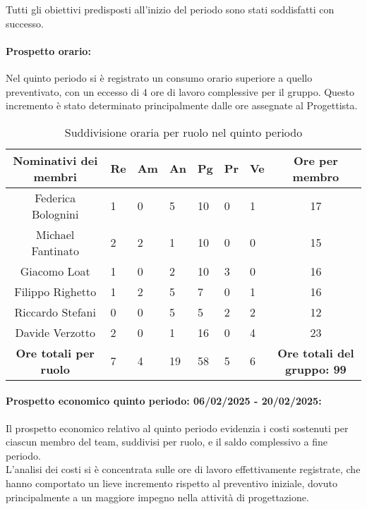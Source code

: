 Tutti gli obiettivi predisposti all'inizio del periodo sono stati soddisfatti con successo.\\

\newpage
\paragraph{Prospetto orario: }
Nel quinto periodo si è registrato un consumo orario superiore a quello preventivato, con un eccesso di 4 ore di lavoro complessive per il gruppo. Questo incremento è stato determinato principalmente dalle ore assegnate al Progettista.
\begin{table}[h!]
    \centering
    \renewcommand{\arraystretch}{1.5}
    \begin{tabularx}{\textwidth}{|c|X|X|X|X|X|X|c|}\hline
    \rowcolor[HTML]{FFD700} 
    \textbf{Nominativi dei membri} & \textbf{Re} & \textbf{Am} & \textbf{An} & \textbf{Pg} & \textbf{Pr} & \textbf{Ve} & \textbf{Ore per membro} \\ \hline
    Federica Bolognini & 1 & 0 & 5 & 10 & 0 & 1 & 17  \\ \hline
    Michael Fantinato  & 2 & 2 & 1 & 10 & 0 & 0 & 15  \\ \hline
    Giacomo Loat       & 1 & 0 & 2 & 10 & 3 & 0 & 16 \\ \hline
    Filippo Righetto   & 1 & 2 & 5 & 7 & 0 & 1 & 16  \\ \hline
    Riccardo Stefani   & 0 & 0 & 5 & 5 & 2 & 2 & 12 \\ \hline
    Davide Verzotto    & 2 & 0 & 1 & 16 & 0 & 4 & 23  \\ \hline
    \rowcolor[HTML]{FFD700} 
    \textbf{Ore totali per ruolo} & 7 & 4 & 19 & 58 & 5 & 6 & \textbf{Ore totali del gruppo: 99} \\ \hline
    \end{tabularx}
    \caption{Suddivisione oraria per ruolo nel quinto periodo}
\end{table}

\paragraph{Prospetto economico quinto periodo: 06/02/2025 - 20/02/2025: }
Il prospetto economico relativo al quinto periodo evidenzia i costi sostenuti per ciascun membro del team, suddivisi per ruolo, e il saldo complessivo a fine periodo.\\
L'analisi dei costi si è concentrata sulle ore di lavoro effettivamente registrate, che hanno comportato un lieve incremento rispetto al preventivo iniziale, dovuto principalmente a un maggiore impegno nella attività di progettazione.\\

